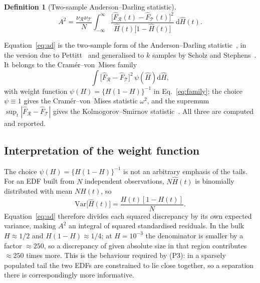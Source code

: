 \documentclass[11pt,a4paper]{article}
\theoremstyle{definition}
\newtheorem{definition}{Definition}[section]
\theoremstyle{plain}
\theoremstyle{remark}
\newcommand{\Rr}{\mathcal{R}}
\newcommand{\Tt}{\mathcal{T}}
\newcommand{\Var}{\mathrm{Var}}
\newcommand{\dif}{\mathrm{d}}
\begin{document}
\begin{definition}[Two-sample Anderson--Darling statistic]
\begin{equation}
  A^{2}
  = \frac{\nu_\Rr \nu_\Tt}{N}
    \int_{-\infty}^{\infty}
    \frac{\bigl[\hat{F}_\Rr(t)-\hat{F}_\Tt(t)\bigr]^{2}}
         {\hat{H}(t)\bigl[1-\hat{H}(t)\bigr]}\ \dif \hat{H}(t).
  \label{eq:ad}
\end{equation}
\end{definition}

Equation~\eqref{eq:ad} is the two-sample form of the Anderson--Darling
statistic~\cite{AndersonDarling1952,AndersonDarling1954}, in the version due to
Pettitt~\cite{Pettitt1976} and generalised to $k$ samples by Scholz and
Stephens~\cite{ScholzStephens1987}. It belongs to the Cram\'er--von~Mises
family~\cite{Cramer1928,vonMises1928}
\begin{equation}
  \int \bigl[\hat{F}_\Rr - \hat{F}_\Tt\bigr]^{2}\, \psi\!\left(\hat{H}\right)
  \dif\hat{H},
  \label{eq:family}
\end{equation}
with weight function $\psi(H) = \{H(1-H)\}^{-1}$ in Eq.~\eqref{eq:family}; the choice $\psi \equiv 1$
gives the Cram\'er--von~Mises statistic $\omega^{2}$, and the supremum
$\sup_t|\hat{F}_\Rr - \hat{F}_\Tt|$ gives the Kolmogorov--Smirnov
statistic~\cite{Kolmogorov1933,Smirnov1939}. All three are computed and
reported.

\subsection{Interpretation of the weight function}
\label{sec:weighting}

The choice $\psi(H) = \{H(1-H)\}^{-1}$ is not an arbitrary emphasis of the
tails. For an EDF built from $N$ independent observations, $N\hat{H}(t)$ is
binomially distributed with mean $NH(t)$, so
\begin{equation}
  \Var\bigl[\hat{H}(t)\bigr] = \frac{H(t)\left[1-H(t)\right]}{N}.
\end{equation}
Equation~\eqref{eq:ad} therefore divides each squared discrepancy by its own
expected variance, making $A^2$ an integral of squared standardised residuals.
In the bulk $H \approx 1/2$ and $H(1-H) \approx 1/4$; at $H = 10^{-3}$ the
denominator is smaller by a factor $\approx 250$, so a discrepancy of given
absolute size in that region contributes $\approx 250$ times more. This is the
behaviour required by (P3): in a sparsely populated tail the two EDFs are
constrained to lie close together, so a separation there is correspondingly more
informative.
\end{document}
